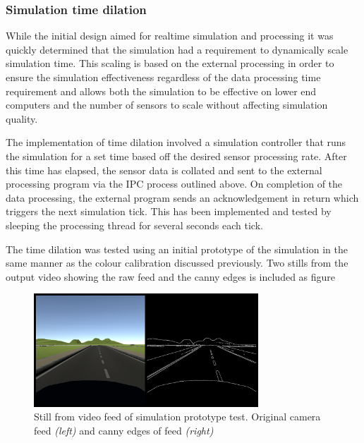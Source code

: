 \documentclass[]{aiaa-tc}%
\begin{document}
\subsubsection{Simulation time dilation}\label{sect:timedilation}

While the initial design aimed for realtime simulation and processing it was quickly determined that the simulation had a requirement to dynamically scale simulation time. This scaling is based on the external processing in order to ensure the simulation effectiveness regardless of the data processing time requirement and allows both the simulation to be effective on lower end computers and the number of sensors to scale without affecting simulation quality.

The implementation of time dilation involved a simulation controller that runs the simulation for a set time based off the desired sensor processing rate. After this time has elapsed, the sensor data is collated and sent to the external processing program via the IPC process outlined above. On completion of the data processing, the external program sends an acknowledgement in return which triggers the next simulation tick. This has been implemented and tested by sleeping the processing thread for several seconds each tick.

The time dilation was tested using an initial prototype of the simulation in the same manner as the colour calibration discussed previously. Two stills from the output video showing the raw feed and the canny edges is included as figure 

\begin{figure} %
	\centering
	\includegraphics[width=0.75\textwidth, height=0.75\textwidth]{simPrototypeIPC.png}
	\caption{Still from video feed of simulation prototype test. Original camera feed \textit{(left)} and canny edges of feed \textit{(right)}}
	\label{f:simPrototypeIPCTest}
\end{figure}
\end{document}

